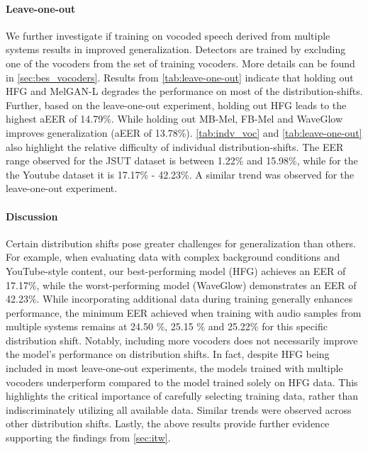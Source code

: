 \paragraph{Leave-one-out} We further investigate if training on vocoded speech derived from multiple systems results in improved generalization. Detectors are trained by excluding one of the vocoders from the set of training vocoders. More details can be found in \autoref{sec:bes_vocoders}. Results from \autoref{tab:leave-one-out} indicate that holding out HFG and MelGAN-L degrades the performance on most of the distribution-shifts.  Further, based on the leave-one-out experiment, holding out HFG leads to the highest aEER of 14.79\%. While holding out MB-Mel, FB-Mel and WaveGlow improves generalization (aEER of 13.78\%). \autoref{tab:indv_voc} and \autoref{tab:leave-one-out} also highlight the relative difficulty of individual distribution-shifts. The EER range observed for the JSUT dataset is between 1.22\% and 15.98\%, while for the the Youtube dataset it is 17.17\% - 42.23\%. A similar trend was observed for the leave-one-out experiment.
\paragraph{Discussion} Certain distribution shifts pose greater challenges for generalization than others. For example, when evaluating data with complex background conditions and YouTube-style content, our best-performing model (HFG) achieves an EER of 17.17\%, while the worst-performing model (WaveGlow) demonstrates an EER of 42.23\%. While incorporating additional data during training generally enhances performance, the minimum EER achieved when training with audio samples from multiple systems remains at 24.50 \%, 25.15 \% and 25.22\% for this specific distribution shift. Notably, including more vocoders does not necessarily improve the model’s performance on distribution shifts. In fact, despite HFG being included in most leave-one-out experiments, the models trained with multiple vocoders underperform compared to the model trained solely on HFG data. This highlights the critical importance of carefully selecting training data, rather than indiscriminately utilizing all available data.  Similar trends were observed across other distribution shifts. Lastly, the above results provide further evidence supporting the findings from \autoref{sec:itw}.
